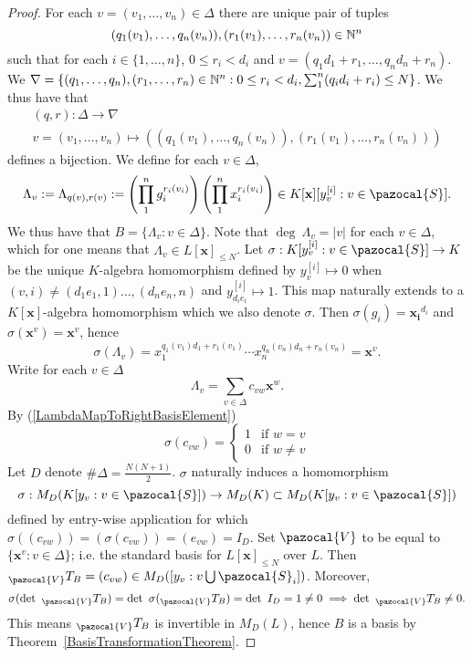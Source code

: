     \begin{proof}
        For each $v=(v_1,\dots,v_n)\in \Delta$ there are unique pair of tuples $$(q_1(v_1),\dots,q_n(v_n)),(r_1(v_1),\dots,r_n(v_n))\in \mathbb{N}^n$$
        such that for each $i\in\{1,\dots,n\}$, $0\leq r_i < d_i$ and $v=(q_1d_1+r_1,\dots,q_nd_n+r_n)$. We $\nabla = \{ (q_1,\dots,q_n),(r_1,\dots,r_n)\in \mathbb{N}^n : 0\leq r_i<d_i, \sum_1^n (q_id_i+r_i) \leq N\}$. We thus have that 
        \begin{gather*}
            (q,r): \Delta \rightarrow \nabla\\
            v=(v_1,\dots,v_n)\mapsto ((q_1(v_1),\dots,q_n(v_n)),(r_1(v_1),\dots,r_n(v_n)))
        \end{gather*}
        defines a bijection. We define for each $v\in \Delta$, 
        $$\Lambda_v := \Lambda_{q(v),r(v)} := \left(\prod_1^n g_i^{r_i(v_i)}\right)\left(\prod_1^n x_i^{r_i(v_i)}\right)\in K[\mathbf{x}][y_v^{[i]} : v\in \pazocal{S}].$$
        We thus have that $B=\{\Lambda_v : v\in \Delta\}$. Note that $\deg \ \Lambda_v = \vert v\vert$ for each $v\in \Delta$, which for one means that $\Lambda_v\in L[\mathbf{x}]_{\leq N}$.  Let $\sigma : K[y_v^{[i]} : v\in  \pazocal{S}]\rightarrow K$ be the unique $K$-algebra homomorphism defined by $y_v^{[i]}\mapsto 0$ when $(v,i)\neq (d_1e_1,1)\dots,(d_ne_n,n)$  and $y_{d_ie_i}^{[i]}\mapsto 1$. This map naturally extends to a $K[\mathbf{x}]$-algebra homomorphism which we also denote $\sigma$. Then $\sigma(g_i) = \mathbf{x_i}^{d_i}$ and $\sigma(\mathbf{x}^v)=\mathbf{x}^v$, hence 
        \begin{equation}\label{LambdaMapToRightBasisElement} 
            \sigma(\Lambda_v)=x_1^{q_1(v_1)d_1+r_1(v_1)}\cdots x_n^{q_n(v_n)d_n+r_n(v_n)}=\mathbf{x}^v.
        \end{equation}
        Write for each $v\in \Delta$
        $$\Lambda_v= \sum_{v\in \Delta} c_{vw}\mathbf{x}^w.$$
        By (\ref{LambdaMapToRightBasisElement}) 
        $$
            \sigma(c_{vw})=
            \begin{cases}
                1 & \text{if } w=v\\
                0 & \text{if } w \neq v
            \end{cases}
        $$
        Let $D$ denote $\# \Delta = \frac{N(N+1)}{2}$. $\sigma$ naturally induces a homomorphism 
        $$\sigma:M_{D}(K[y_v : v\in\pazocal{S}]) \rightarrow M_D(K)\subset M_D(K[y_v : v\in\pazocal{S}])$$ 
        defined by entry-wise application for which $\sigma((c_{vw}))= (\sigma(c_{vw}))=(e_{vw})=I_D$. Set $\pazocal{V}$ to be equal to $\{\mathbf{x}^v : v\in \Delta\}$; i.e. the standard basis for $L[\mathbf{x}]_{\leq N}$ over $L$. Then $_\pazocal{V}T_B = (c_{vw})\in M_D([y_v : v\bigcup \pazocal{S}_i])$. Moreover, 
        $$\sigma(\det\ _\pazocal{V}T_B)=\det\ \sigma(_\pazocal{V}T_B)=\det \ I_D = 1\neq 0\implies \det \ _\pazocal{V}T_B\neq 0.$$
        This means $_\pazocal{V}T_B$ is invertible in $M_D(L)$, hence $B$ is a basis by Theorem~\ref{BasisTransformationTheorem}.
    \end{proof}
